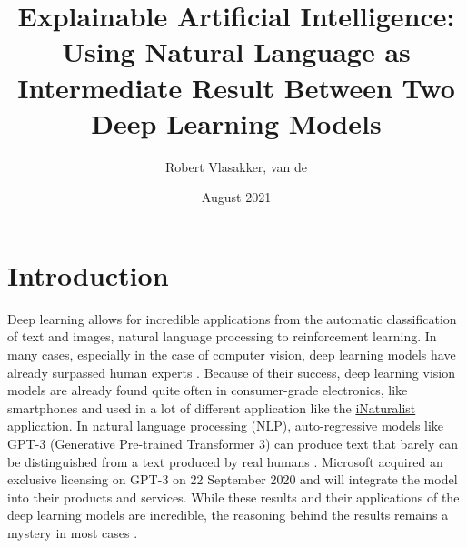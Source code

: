 \documentclass{article}
\title{Explainable Artificial Intelligence: Using Natural Language as Intermediate Result Between Two Deep Learning Models}
\author{Robert Vlasakker, van de}
\date{August 2021}
\begin{document}
\maketitle

\section{Introduction}
Deep learning allows for incredible applications from the automatic classification of text and images, natural language processing to reinforcement learning.
In many cases, especially in the case of computer vision, deep learning models have already surpassed human experts \cite{he_delving_2015}.
Because of their success, deep learning vision models are already found quite often in consumer-grade electronics, like smartphones and used in a lot of different application like the \href{https://www.inaturalist.org/}{iNaturalist} application.
In natural language processing (NLP), auto-regressive models like GPT-3 (Generative Pre-trained Transformer 3) can produce text that barely can be distinguished from a text produced by real humans \cite{brown_language_2020}.
Microsoft acquired an exclusive licensing on GPT-3 on 22 September 2020 and will integrate the model into their products and services.
While these results and their applications of the deep learning models are incredible, the reasoning behind the results remains a mystery in most cases \cite{li_interpretable_2021, losch_interpretability_2019}.
\end{document}
